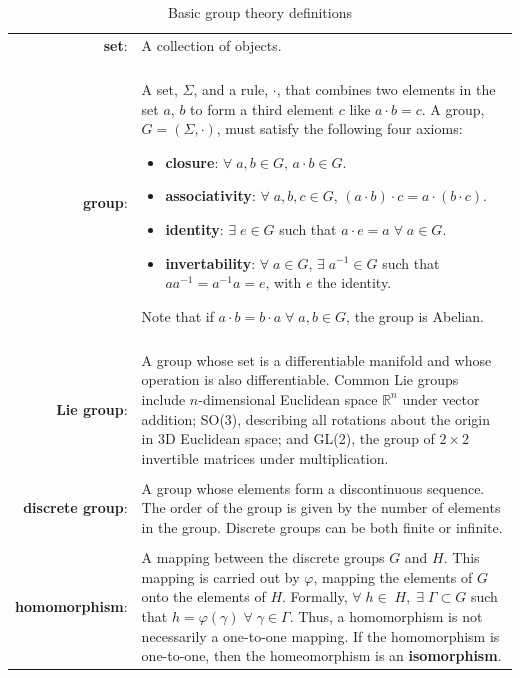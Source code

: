 \begin{table}[t]
  \centering
\caption{Basic group theory definitions}
\begin{tabular}{|r l|}
\hline
{\bf set}:& A collection of objects.\\ \\
{\bf group}:& \begin{minipage}[t]{0.65\textwidth}
A set, $\Sigma$, and a rule, $\cdot$, that combines two elements in the set $a$, $b$ to form a third element $c$ like $a \cdot b=c$. A group, $G = (\Sigma, \cdot)$, must satisfy the following four axioms:
    \begin{itemize}
      \item[]{\bf closure}: $\forall \; a, b \in G$, $a \cdot b \in G$.
      \item[]{\bf associativity}: $\forall \; a,b,c \in G$, $(a \cdot b) \cdot c = a \cdot (b \cdot c)$.
      \item[]{\bf identity}: $\exists \; e \in G$ such that $a\cdot e=a \; \forall \; a \in G$.
      \item[]{\bf invertability}: $\forall \; a \in G$, $\exists \; a^{-1} \in G$ such that $a a^{-1} = a^{-1} a = e$, with $e$ the identity.
    \end{itemize}
    Note that if $a \cdot b = b \cdot a \; \forall \; a,b \in G$, the group is Abelian.
\end{minipage}\\ \\
{\bf Lie group}:& \begin{minipage}[t]{0.65\textwidth}
A group whose set is a differentiable manifold and whose operation is also differentiable. Common Lie groups include $n$-dimensional Euclidean space $\mathbb{R}^n$ under vector addition; SO(3), describing all rotations about the origin in 3D Euclidean space; and GL(2), the group of $2 \times 2$ invertible matrices under multiplication.
\end{minipage}\\ \\
{\bf discrete group}:& \begin{minipage}[t]{0.65\textwidth}
A group whose elements form a discontinuous sequence. The order of the group is given by the number of elements in the group. Discrete groups can be both finite or infinite.
\end{minipage}\\ \\
{\bf homomorphism}:& \begin{minipage}[t]{0.65\textwidth}
A mapping between the discrete groups $G$ and $H$. This mapping is carried out by $\varphi$, mapping the elements of $G$ onto the elements of $H$. Formally, $\forall \; h \in \; H, \; \exists \; \Gamma \subset G$ such that $h = \varphi(\gamma) \; \forall \; \gamma \in \Gamma$. Thus, a homomorphism is not necessarily a one-to-one mapping. If the homomorphism is one-to-one, then the homeomorphism is an {\bf isomorphism}.
\end{minipage}\\
\hline
\end{tabular}
\label{t:2-GroupTheory}
\end{table}
